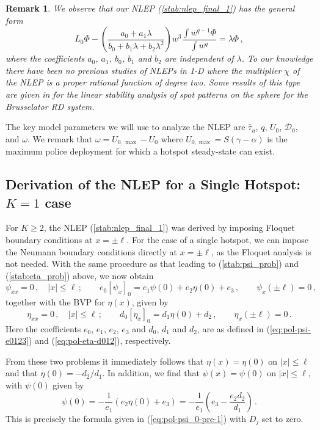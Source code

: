 \documentclass{article}%
\newtheorem{rem}[theorem]{Remark}
\begin{document}
\begin{rem} We observe that our NLEP (\ref{stab:nlep_final_1})
has the general form
\[
L_{0}\Phi-\left(\frac{a_{0}+a_{1}\lambda}{b_{0}+b_{1}\lambda+b_{2}\lambda^{2}}
 \right) w^{3}\frac{\int w^{q-1}\Phi}{\int w^{q}}=\lambda\Phi \,,
\]
where the coefficients $a_0$, $a_1$, $b_0$, $b_1$ and $b_2$ are
independent of $\lambda$. To our knowledge there have been no previous
studies of NLEPs in 1-D where the multiplier $\chi$ of the NLEP is a
proper rational function of degree two. Some results of this type are
given in \cite{RRW} for the linear stability analysis of spot patterns
on the sphere for the Brusselator RD system.
\end{rem}

The key model parameters we will use to analyze the NLEP are
$\hat{\tau}_u$, $q$, $U_0$, ${\mathcal D}_0$, and $\omega$. We remark
that $\omega=U_{0,\max}-U_{0}$ where $U_{0,\max}=S(\gamma-\alpha)$ is
the maximum police deployment for which a hotspot steady-state can
exist.

\subsection{Derivation of the NLEP for a Single Hotspot: $K=1$ case}
\label{stab:onespot} 

For $K\geq 2$, the NLEP (\ref{stab:nlep_final_1}) was derived by
imposing Floquet boundary conditions at $x=\pm \ell$. For the case of
a single hotspot, we can impose the Neumann boundary conditions
directly at $x=\pm \ell$, as the Floquet analysis is not needed. With
the same procedure as that leading to (\ref{stab:psi_prob}) and
(\ref{stab:eta_prob}) above, we now obtain 
\begin{equation}
\psi_{xx}  =  0\,, \quad|x|\leq\ell\,; \qquad
e_{0}\left[\psi_{x}\right]_{0}  =  e_{1}\psi(0)+e_{2}\eta(0)+e_{3}\,, \qquad
\psi_{x}(\pm\ell) =0\,, \label{eq:pol-psi-ode-neumann}
\end{equation}
together with the BVP for $\eta(x)$, given by
\begin{equation}
\eta_{xx}  =  0\,, \quad |x|\leq\ell\,; \qquad
d_{0}\left[\eta_{x}\right]_{0}  =  d_{1}\eta(0)+d_{2}\,,
\qquad \eta_{x}(\pm\ell) =0 \,. \label{eq:pol-eta-ode-neumann}
\end{equation}
Here the coefficients $e_{0}$, $e_{1}$, $e_{2}$, $e_{3}$ and $d_{0}$,
$d_{1}$ and $d_{2}$, are as defined in (\ref{eq:pol-psi-e0123}) and
(\ref{eq:pol-eta-d012}), respectively.

From these two problems it immediately follows that $\eta(x)=\eta(0)$
on $|x|\leq \ell$ and that $\eta(0)=-d_{2}/d_{1}$. In addition, we find that
$\psi(x)=\psi(0)$ on $|x|\leq \ell$, with $\psi(0)$ given by
\begin{equation*}
\psi(0) = -\frac{1}{e_{1}}\left(e_{2}\eta(0)+e_{3}\right) =
-\frac{1}{e_{1}}\left(e_{3}-\frac{e_{2}d_{2}}{d_{1}}\right)\,.
\end{equation*}
This is precisely the formula given in (\ref{eq:pol-psi_0-pre-1}) with
$D_{j}$ set to zero.
\end{document}
